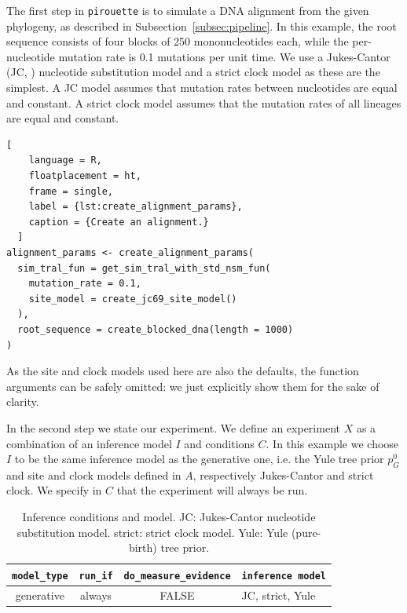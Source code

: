 The first step in \verb;pirouette; is to simulate a DNA alignment from the 
given phylogeny, as described in Subsection~\ref{subsec:pipeline}.
In this example, the root sequence consists of four blocks of 250 
mononucleotides each, while the per-nucleotide mutation rate is 
0.1 mutations per unit time.
We use a Jukes-Cantor (JC, \cite{jukes1969evolution}) nucleotide substitution model
and a strict clock model as these are the simplest.
A JC model assumes that mutation rates between nucleotides are equal and 
constant. 
A strict clock model assumes that the mutation rates 
of all lineages are equal and constant.

\begin{lstlisting}[
    language = R,
    floatplacement = ht,
    frame = single,
    label = {lst:create_alignment_params}, 
    caption = {Create an alignment.}
  ]
alignment_params <- create_alignment_params(
  sim_tral_fun = get_sim_tral_with_std_nsm_fun(
    mutation_rate = 0.1,
    site_model = create_jc69_site_model()
  ),
  root_sequence = create_blocked_dna(length = 1000)
)
\end{lstlisting}

As the site and clock models used here are also the defaults, 
the function arguments can be safely omitted: we just explicitly show 
them for the sake of clarity.

In the second step we state our experiment.
We define an experiment $\mathit{X}$ as a combination of an inference model 
$\mathit{I}$ and conditions $\mathit{C}$.
In this example we choose $\mathit{I}$ to be the same inference model as 
the generative one,
i.e. the Yule tree prior $\mathit{p_{G}^0}$ and site 
and clock models defined in $\mathit{A}$, 
respectively Jukes-Cantor and strict clock.
We specify in $\mathit{C}$ that the experiment will always be run.

\begin{table}
  \begin{tabular}{ | c | c | c | l | }
    \hline
    \texttt{model\_type} &
    \texttt{run\_if} &
    \texttt{do\_measure\_evidence} & 
    \texttt{inference model} \\ 
    \hline
    generative &
    always &
    FALSE &
    JC, strict, Yule \\
    \hline
  \end{tabular}
  \caption{
    Inference conditions and model.
    JC: Jukes-Cantor nucleotide substitution model.
    strict: strict clock model.
    Yule: Yule (pure-birth) tree prior.
  }
  \label{tab:RQ1}
\end{table}

